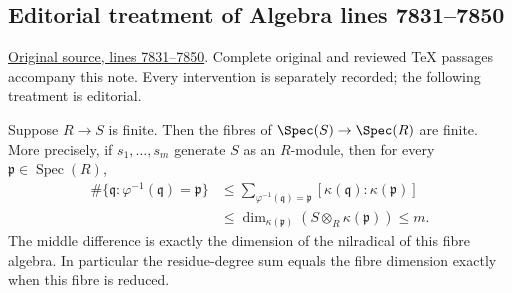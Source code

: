 \subsection{Editorial treatment of Algebra lines 7831--7850}

\hypertarget{algebra-context-085}{}

\noindent\href{https://github.com/stacks/stacks-project/blob/a04446e57ec1fbc252a871afcec7752fb2807b14/algebra.tex\#L7831}{Original source, lines 7831--7850}. Complete original and reviewed TeX passages accompany this note. Every intervention is separately recorded; the following treatment is editorial.


\begin{lemma}
\label{editorial-source-lemma-finite-finite-fibres}
Suppose $R \to S$ is finite.
Then the fibres of $\Spec(S)\to\Spec(R)$ are finite.
More precisely, if $s_1,\ldots,s_m$ generate $S$ as an $R$-module,
then for every $\mathfrak p\in\operatorname{Spec}(R)$,
$$
\begin{aligned}
\#\{\mathfrak q:\varphi^{-1}(\mathfrak q)=\mathfrak p\}
&\leq\sum_{\varphi^{-1}(\mathfrak q)=\mathfrak p}
[\kappa(\mathfrak q):\kappa(\mathfrak p)]
\\
&\leq\dim_{\kappa(\mathfrak p)}(S\otimes_R\kappa(\mathfrak p))
\leq m.
\end{aligned}
$$
The middle difference is exactly the dimension of the nilradical
of this fibre algebra. In particular the residue-degree sum equals
the fibre dimension exactly when this fibre is reduced.
\end{lemma}


